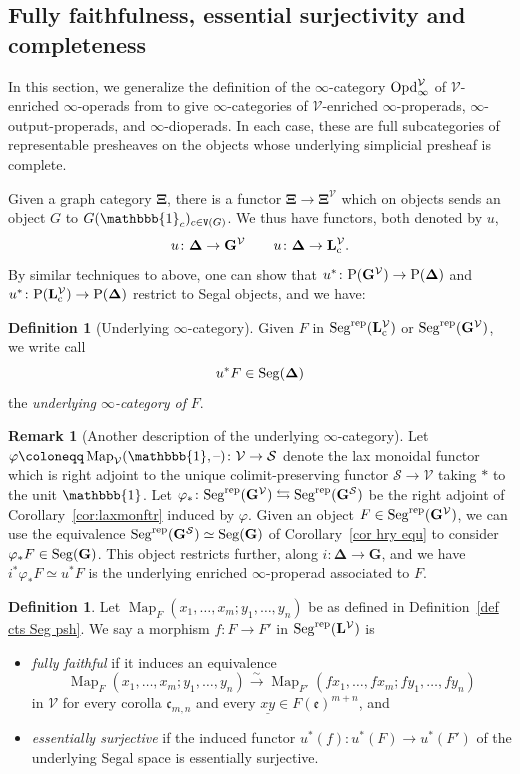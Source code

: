 \documentclass{amsart}
\numberwithin{theorem}{subsection}
\theoremstyle{definition}
\newtheorem{definition}[theorem]{Definition}
\newtheorem{remark}[theorem]{Remark}
\newcommand{\bbone}{\mathbbb{1}}
\newcommand{\xMap}{\operatorname{Map}}
\newcommand{\xS}{\mathcal{S}}
\newcommand{\xV}{\mathcal{V}}
\newcommand{\xfe}{\mathfrak{e}}
\newcommand{\xfc}{\mathfrak{c}}
\newcommand{\Pre}{\name{P}}
\newcommand{\isoto}{\xrightarrow{\sim}}
\newcommand{\name}[1]{\ensuremath{\text{\textup{#1}}}}
\newcommand{\simp}{\mathbf{\Delta}}
\newcommand{\levelg}{\mathbf{L}}
\newcommand{\levelV}{\levelg^\xV}
\newcommand{\levelgconn}{\levelg_{\name{c}}}
\newcommand{\levelcV}{\levelgconn^{\xV}}
\newcommand{\bbY}{\mathbf{G}}
\newcommand{\bbYV}{\bbY^{\xV}}
\newcommand{\gc}{\mathbf{\Xi}}
\newcommand{\gcV}{\gc^{\xV}}
\newcommand{\Seg}{\name{Seg}}
\newcommand{\blank}{\text{\textendash}}
\newcommand{\vertex}{\mathtt{V}}
\newcommand{\Segrep}{\Seg^{\name{rep}}}
\begin{document}
\subsection{Fully faithfulness, essential surjectivity and completeness}\label{subsec ffesc}
In this section, we generalize the definition of the $\infty$-category $\name{Opd}^\xV_\infty$ of $\xV$-enriched $\infty$-operads from \cite[\S3.2]{ChuHaugseng} to give $\infty$-categories of $\xV$-enriched $\infty$-properads, $\infty$-output-properads, and $\infty$-dioperads.
In each case, these are full subcategories of representable presheaves on the objects whose underlying simplicial presheaf is complete.

Given a graph category $\gc$, there is a functor $\gc \to \gcV$ which on objects sends an object $G$ to $G(\bbone_c)_{c\in\vertex(G)}$.
We thus have functors, both denoted by $u$,
\[
	u \colon \simp \to \bbYV \qquad u \colon \simp \to \levelcV.
\]
By similar techniques to above, one can show that $u^* \colon \Pre(\bbYV) \to \Pre(\simp)$ and $u^* \colon \Pre(\levelcV) \to \Pre(\simp)$ restrict to Segal objects, and we have:
\begin{definition}[Underlying $\infty$-category]
Given $F$ in $\Segrep(\levelcV)$ or $\Segrep(\bbYV)$, we write call 
\[
	u^*F \in \Seg(\simp)
\]
the \emph{underlying $\infty$-category of} $F$.
\end{definition}
 
\begin{remark}[Another description of the underlying $\infty$-category]
Let $\varphi \coloneqq \xMap_\xV(\bbone, \blank)\colon \xV\to \xS$ denote the lax monoidal functor which is right adjoint to the unique colimit-preserving functor $\xS\to \xV$ taking $*$ to the unit $\bbone$.
Let $\varphi_*\colon \Segrep(\bbYV) \leftrightarrows  \Segrep(\bbY^\xS)$ be the right adjoint of Corollary~\ref{cor:laxmonftr} induced by $\varphi$.
Given an object $F\in \Segrep(\bbYV)$, we can use the equivalence $\Segrep(\bbY^\xS)\simeq \Seg(\bbY)$ of Corollary~\ref{cor hry equ} to consider $\varphi_*F \in \Seg(\bbY)$.
This object restricts further, along $i \colon \simp \to \bbY$, and we have $i^*\varphi_*F \simeq u^*F$ is the underlying enriched $\infty$-properad associated to $F$.
\end{remark}


\begin{definition}\label{def ffes}
	Let $\xMap_F(x_{1},\ldots, x_{m};y_1,\ldots, y_n)$ be as defined in Definition~\ref{def cts Seg psh}. We say a morphism $f\colon F\to F'$ in $\Segrep(\levelV)$ is
	\begin{itemize}
		\item \emph{fully faithful} if it induces an equivalence
		$$\xMap_F(x_{1},\ldots, x_{m};y_1,\ldots, y_n)\isoto \xMap_{F'}(fx_{1},\ldots, fx_{m};fy_1,\ldots,f y_n)$$ in $\xV$ for every corolla $\xfc_{m,n}$ and every $\underline{xy} \in F(\xfe)^{m+n}$, and
		\item \emph{essentially surjective} if the induced functor $u^*(f)\colon u^*(F)\to  u^*(F')$ of the underlying Segal space is essentially surjective.
	\end{itemize}
\end{definition}
\end{document}
